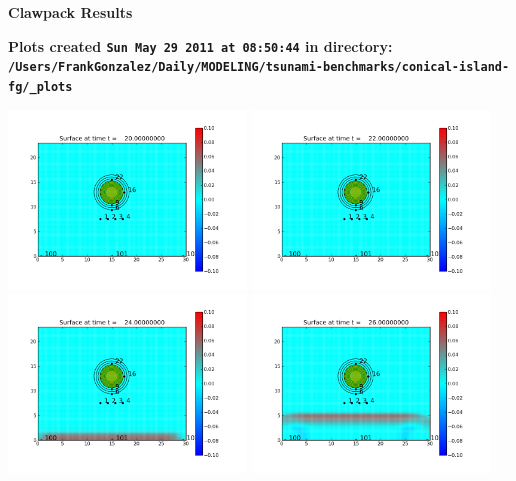 \documentclass[11pt]{article}
\begin{document}
        \begin{center}{\Large\bf Clawpack Results}\vskip 5pt
        
        \bf Plots created {\tt Sun May 29 2011 at 08:50:44} in directory: \vskip 5pt
        \verb+/Users/FrankGonzalez/Daily/MODELING/tsunami-benchmarks/conical-island-fg/_plots+
        \end{center}
        \vskip 5pt
        \includegraphics[width=0.475\textwidth]{frame0000fig0.png}
\vskip 10pt 
\includegraphics[width=0.475\textwidth]{frame0001fig0.png}
\vskip 10pt 
\includegraphics[width=0.475\textwidth]{frame0002fig0.png}
\vskip 10pt 
\includegraphics[width=0.475\textwidth]{frame0003fig0.png}
\end{document}
